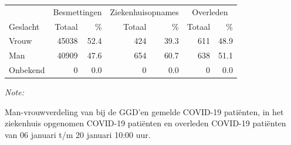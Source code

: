 \documentclass[
  english,
  man,floatsintext]{apa6}
\begin{document}
\begin{table}[H]
\centering\begingroup\fontsize{11}{13}\selectfont

\begin{threeparttable}
\begin{tabular}{lrrrrrr}
\toprule
\multicolumn{1}{c}{ } & \multicolumn{2}{c}{Besmettingen} & \multicolumn{2}{c}{Ziekenhuisopnames} & \multicolumn{2}{c}{Overleden} \\
\cmidrule(l{3pt}r{3pt}){2-3} \cmidrule(l{3pt}r{3pt}){4-5} \cmidrule(l{3pt}r{3pt}){6-7}
Geslacht & Totaal & \% & Totaal & \% & Totaal & \%\\
\midrule
Vrouw & 45038 & 52.4 & 424 & 39.3 & 611 & 48.9\\
Man & 40909 & 47.6 & 654 & 60.7 & 638 & 51.1\\
Onbekend & 0 & 0.0 & 0 & 0.0 & 0 & 0.0\\
\bottomrule
\end{tabular}
\begin{tablenotes}
\item \textit{Note: } 
\item Man-vrouwverdeling van bij de GGD’en gemelde COVID-19 patiënten, in het ziekenhuis opgenomen COVID-19 patiënten en overleden COVID-19 patiënten van 06 januari t/m 20 januari 10:00 uur.
\end{tablenotes}
\end{threeparttable}
\endgroup{}
\end{table}
\newpage
\end{document}
